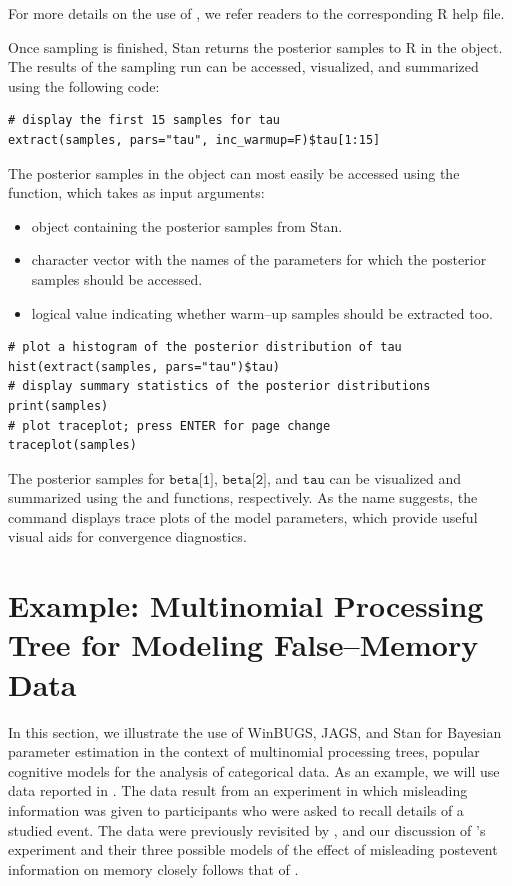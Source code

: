 \noindent For more details on the use of , we refer readers to the corresponding R help file.

Once sampling is finished, Stan returns the posterior samples to R in the  object. The results of the sampling run can be accessed, visualized, and summarized using the following code:

\begin{lstlisting}
# display the first 15 samples for tau
extract(samples, pars="tau", inc_warmup=F)$tau[1:15]
\end{lstlisting}

\noindent The posterior samples in the  object can most easily be accessed using the  function, which takes as input arguments:
\begin{itemize}
\item {} object containing the posterior samples from Stan.
\item {} character vector with the names of the parameters for which the posterior samples should be accessed.
\item {} logical value indicating whether warm--up samples should be extracted too.
\end{itemize}

\begin{lstlisting}
# plot a histogram of the posterior distribution of tau
hist(extract(samples, pars="tau")$tau)
# display summary statistics of the posterior distributions
print(samples)
# plot traceplot; press ENTER for page change
traceplot(samples)
\end{lstlisting}

\noindent The posterior samples for $\texttt{beta[1]}$, $\texttt{beta[2]}$, and $\texttt{tau}$ can be visualized and summarized using the  and  functions, respectively. As the name suggests, the  command displays trace plots of the model parameters, which provide useful visual aids for convergence diagnostics.



\section{Example: Multinomial Processing Tree for Modeling False--Memory Data}

{In this section, we illustrate the use of WinBUGS, JAGS, and Stan for Bayesian parameter estimation in the context of multinomial processing trees, popular cognitive models for the analysis of categorical data. As an example, we will use data reported in }. The data result from an experiment in which misleading information was given to participants who were asked to recall details of a studied event. The data were previously revisited by , and our discussion of \citeauthor{WagenaarBoer1987}'s experiment and their three possible models of the effect of misleading postevent information on memory closely follows that of \citeauthor{Vandekerckhove2015}.

